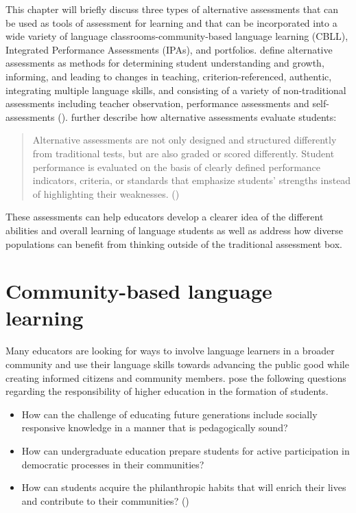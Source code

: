 \documentclass[output=paper]{langscibook}
\begin{document}
This chapter will briefly discuss three types of alternative assessments that can be used as tools of assessment for learning and that can be incorporated into a wide variety of language classrooms-community-based language learning (CBLL), Integrated Performance Assessments (IPAs), and portfolios. \citet{PierceOMalley1992} define alternative assessments as methods for determining student understanding and growth, informing, and leading to changes in teaching, criterion-referenced, authentic, integrating multiple language skills, and consisting of a variety of non-traditional assessments including teacher observation, performance assessments and self-assessments (\citeyear[4]{PierceOMalley1992}). \citet{TedickKlee1998} further describe how alternative assessments evaluate students:

\begin{quote}
Alternative assessments are not only designed and structured differently from traditional tests, but are also graded or scored differently. Student performance is evaluated on the basis of clearly defined performance indicators, criteria, or standards that emphasize students' strengths instead of highlighting their weaknesses. (\citeyear[3]{PierceOMalley1992})
\end{quote}

These assessments can help educators develop a clearer idea of the different abilities and overall learning of language students as well as address how diverse populations can benefit from thinking outside of the traditional assessment box.

\section{Community-based language learning}

Many educators are looking for ways to involve language learners in a broader community and use their language skills towards advancing the public good while creating informed citizens and community members. \citet{BringleHudson2004} pose the following questions regarding the responsibility of higher education in the formation of students.

\begin{itemize}
\item How can the challenge of educating future generations include socially responsive knowledge in a manner that is pedagogically sound?
\item How can undergraduate education prepare students for active participation in democratic processes in their communities?
\item How can students acquire the philanthropic habits that will enrich their lives and contribute to their communities? (\citeyear[3]{BringleHudson2004})
\end{itemize}
\end{document}
